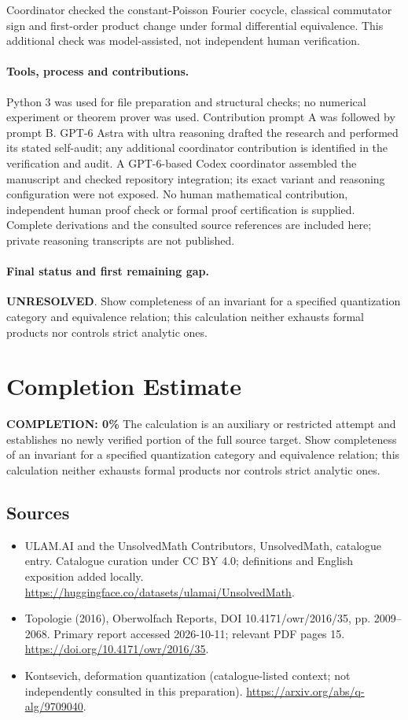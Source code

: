 \documentclass[11pt]{article}
\begin{document}
Coordinator checked the constant-Poisson Fourier cocycle, classical commutator sign and first-order product change under formal differential equivalence. This additional check was model-assisted, not independent human verification.

\paragraph{Tools, process and contributions.}
Python 3 was used for file preparation and structural checks; no numerical experiment or theorem prover was used. Contribution prompt A was followed by prompt B. GPT-6 Astra with ultra reasoning drafted the research and performed its stated self-audit; any additional coordinator contribution is identified in the verification and audit. A GPT-6-based Codex coordinator assembled the manuscript and checked repository integration; its exact variant and reasoning configuration were not exposed. No human mathematical contribution, independent human proof check or formal proof certification is supplied. Complete derivations and the consulted source references are included here; private reasoning transcripts are not published.

\paragraph{Final status and first remaining gap.}
\textbf{UNRESOLVED}. Show completeness of an invariant for a specified quantization category and equivalence relation; this calculation neither exhausts formal products nor controls strict analytic ones.

\section{Completion Estimate}
\noindent\textbf{COMPLETION: 0\%}
The calculation is an auxiliary or restricted attempt and establishes no newly verified portion of the full source target. Show completeness of an invariant for a specified quantization category and equivalence relation; this calculation neither exhausts formal products nor controls strict analytic ones.

\subsection{Sources}
\begin{itemize}
\item[\hypertarget{source:statement:1}{S1}] ULAM.AI and the UnsolvedMath Contributors, UnsolvedMath, catalogue entry. Catalogue curation under CC BY 4.0; definitions and English exposition added locally.
\url{https://huggingface.co/datasets/ulamai/UnsolvedMath}.
\item[\hypertarget{source:statement:2}{S2}] Topologie (2016), Oberwolfach Reports, DOI 10.4171/owr/2016/35, pp. 2009--2068. Primary report accessed 2026-10-11; relevant PDF pages 15.
\url{https://doi.org/10.4171/owr/2016/35}.
\item[\hypertarget{source:statement:3}{S3}] Kontsevich, deformation quantization (catalogue-listed context; not independently consulted in this preparation).
\url{https://arxiv.org/abs/q-alg/9709040}.
\end{itemize}
\label{end:statement}
\end{document}
